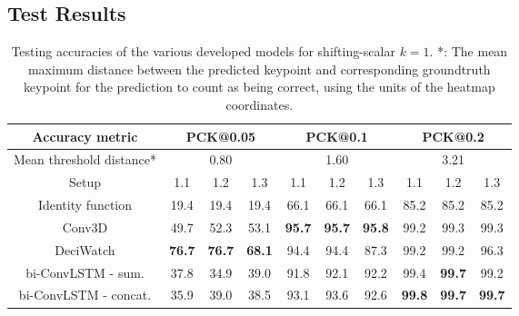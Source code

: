 \documentclass[./main.tex]{subfiles}
\begin{document}
\subsection{Test Results}
\begin{table}[htbp]
    \begin{tabular}{c||ccc|ccc|ccc}
        \hline
        Accuracy metric & \multicolumn{3}{c}{PCK@0.05} & \multicolumn{3}{c}{PCK@0.1} & \multicolumn{3}{c}{PCK@0.2} \\
        \hline
        Mean threshold distance* & \multicolumn{3}{c}{0.80} & \multicolumn{3}{c}{1.60} & \multicolumn{3}{c}{3.21} \\
        \hline
        Setup & 1.1 & 1.2 & 1.3 & 1.1 & 1.2 & 1.3 & 1.1 & 1.2 & 1.3 \\
        \hline
        \hline
        Identity function & 19.4 & 19.4 & 19.4 & 66.1 & 66.1 & 66.1 & 85.2 & 85.2 & 85.2 \\
        Conv3D & 49.7 & 52.3 & 53.1 & \textbf{95.7} & \textbf{95.7} & \textbf{95.8} & 99.2 & 99.3 & 99.3 \\
        DeciWatch & \textbf{76.7} & \textbf{76.7} & \textbf{68.1} & 94.4 & 94.4 & 87.3 & 99.2 & 99.2 & 96.3 \\
        bi-ConvLSTM - sum. & 37.8 & 34.9 & 39.0 & 91.8 & 92.1 & 92.2 & 99.4 & \textbf{99.7} & 99.2 \\
        bi-ConvLSTM - concat. & 35.9 & 39.0 & 38.5 & 93.1 & 93.6 & 92.6 & \textbf{99.8} & \textbf{99.7} & \textbf{99.7} \\
        \hline
    \end{tabular}
    \caption{Testing accuracies of the various developed models for shifting-scalar $k = 1$. *: The mean maximum distance between the predicted keypoint and corresponding groundtruth keypoint for the prediction to count as being correct, using the units of the heatmap coordinates.}
    \label{tab:finetune_test_accs_1}
\end{table}
\end{document}
